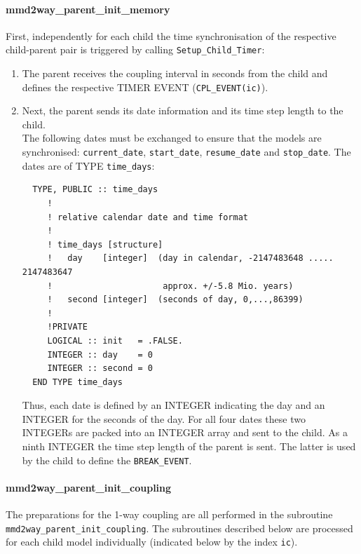\documentclass[11pt,twoside]{article}
\begin{document}
\paragraph{\bf mmd2way\_parent\_init\_memory\\}\label{sec:Sinitmem}
First, independently for each child the time synchronisation of the
respective child-parent pair is triggered by calling \verb|Setup_Child_Timer|:
\begin{enumerate} %
\item The parent receives the coupling interval in seconds from the 
child and defines the respective TIMER {\footnotesize EVENT} 
(\verb|CPL_EVENT(ic)|).
\item Next, the parent sends its date information and its time step
length to the child.\\
The following dates must be exchanged to ensure that the models are
synchronised: 
\verb|current_date|, \verb|start_date|, \verb|resume_date| and \verb|stop_date|.
The dates are of {\footnotesize TYPE} \verb|time_days|:
\begin{verbatim}
  TYPE, PUBLIC :: time_days 
     !
     ! relative calendar date and time format
     !
     ! time_days [structure]
     !   day    [integer]  (day in calendar, -2147483648 ..... 2147483647
     !                      approx. +/-5.8 Mio. years)
     !   second [integer]  (seconds of day, 0,...,86399)
     !
     !PRIVATE
     LOGICAL :: init   = .FALSE.
     INTEGER :: day    = 0
     INTEGER :: second = 0
  END TYPE time_days
\end{verbatim}
Thus, each date is defined by an {\footnotesize INTEGER} indicating the day and
 an {\footnotesize INTEGER} for the seconds of the day. For all four dates these
 two {\footnotesize INTEGERs} are packed into an {\footnotesize INTEGER} array
 and 
sent to the child. As a ninth {\footnotesize INTEGER} the time step 
length of the parent is sent. The latter is used by the child to define
 the \verb|BREAK_EVENT|. 
\end{enumerate}%

\paragraph{\bf mmd2way\_parent\_init\_coupling\\}\label{sec:Sinitcpl}
The preparations for the 1-way coupling are all performed in the subroutine
\verb|mmd2way_parent_init_coupling|. 
The subroutines described below are processed for each child model
individually (indicated below by the index \verb|ic|).
\end{document}
